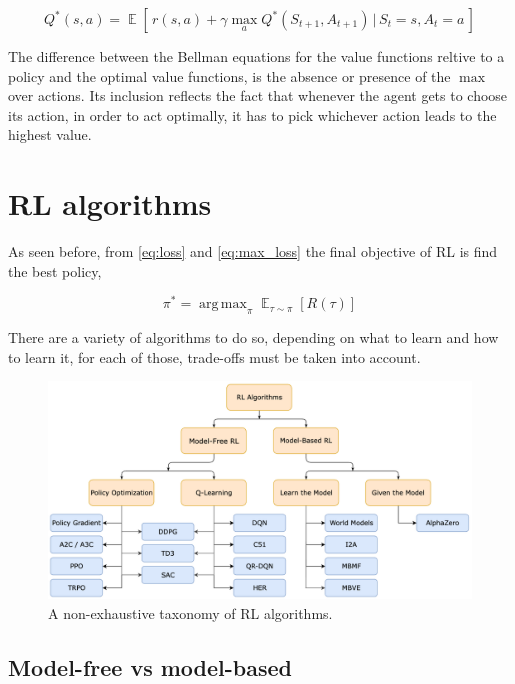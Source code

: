 \documentclass{article}
\DeclareMathOperator*{\E}{\mathbb{E}}
\DeclareMathOperator*{\argmax}{arg\,max}
\begin{document}
\begin{equation}
	Q^{*}(s,a) = \E[\, {r(s,a) + \gamma \max_a {Q^{*}(S_{t+1}, A_{t+1})} \,|\, S_t = s, A_t = a} \,]
\end{equation}

The difference between the Bellman equations for the value functions reltive to a policy and the optimal value functions, is the absence or presence of the $\max$ over actions. Its inclusion reflects the fact that whenever the agent gets to choose its action, in order to act optimally, it has to pick whichever action leads to the highest value.

\section{RL algorithms}
As seen before, from \autoref{eq:loss} and \autoref{eq:max_loss} the final objective of RL is find the best policy,

\begin{equation}
	\pi^* = \argmax_\pi \E_{\tau \sim \pi}{[R(\tau)]}
	\label{eq:objective}
\end{equation}

There are a variety of algorithms to do so, depending on what to learn and how to learn it, for each of those, trade-offs must be taken into account.

\begin{figure}[h]
	\centering
	\includegraphics[width=13cm]{rl-taxonomy.png}
	\caption{A non-exhaustive taxonomy of RL algorithms. \cite{SpinningUp2018}}
	\label{fig:rl-taxonomy}
\end{figure}


\subsection{Model-free vs model-based}
\end{document}
